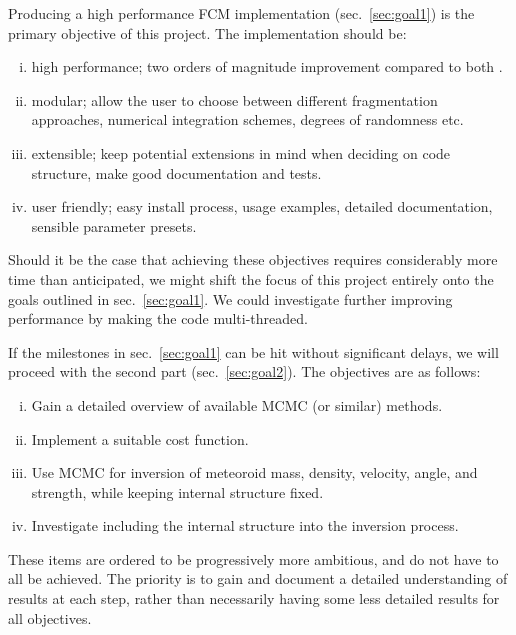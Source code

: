 Producing a high performance FCM implementation (sec.~\ref{sec:goal1}) is the primary objective of this project.
The implementation should be:
\begin{enumerate}[(i)]
    \item high performance; two orders of magnitude improvement compared to both \cite{mehta2015break,newland2019CFM18}.
    \item modular; allow the user to choose between different fragmentation approaches, numerical integration schemes, degrees of randomness etc.
    \item extensible; keep potential extensions in mind when deciding on code structure, make good documentation and tests.
    \item user friendly; easy install process, usage examples, detailed documentation, sensible parameter presets.
\end{enumerate}

Should it be the case that achieving these objectives requires considerably more time than anticipated, we might shift the focus of this project entirely onto the goals outlined in sec.~\ref{sec:goal1}.
We could investigate further improving performance by making the code multi-threaded.

If the milestones in sec.~\ref{sec:goal1} can be hit without significant delays, we will proceed with the second part (sec.~\ref{sec:goal2}). The objectives are as follows:
\begin{enumerate}[(i)]
    \item Gain a detailed overview of available MCMC (or similar) methods.
    \item Implement a suitable cost function.
    \item Use MCMC for inversion of meteoroid mass, density, velocity, angle, and strength, while keeping internal structure fixed.
    \item Investigate including the internal structure into the inversion process.
\end{enumerate}
These items are ordered to be progressively more ambitious, and do not have to all be achieved.
The priority is to gain and document a detailed understanding of results at each step, rather than necessarily having some less detailed results for all objectives.
